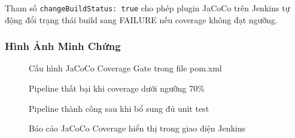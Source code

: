 Tham số \texttt{changeBuildStatus: true} cho phép plugin JaCoCo trên Jenkins tự động đổi trạng thái build sang FAILURE nếu coverage không đạt ngưỡng.

\subsubsection{Hình Ảnh Minh Chứng}

\begin{figure}[H]
\centering
{}
\caption{Cấu hình JaCoCo Coverage Gate trong file pom.xml}
\end{figure}

\begin{figure}[H]
\centering
{}
\caption{Pipeline thất bại khi coverage dưới ngưỡng 70\%}
\end{figure}

\begin{figure}[H]
\centering
{}
\caption{Pipeline thành công sau khi bổ sung đủ unit test}
\end{figure}

\begin{figure}[H]
\centering
{}
\caption{Báo cáo JaCoCo Coverage hiển thị trong giao diện Jenkins}
\end{figure}
